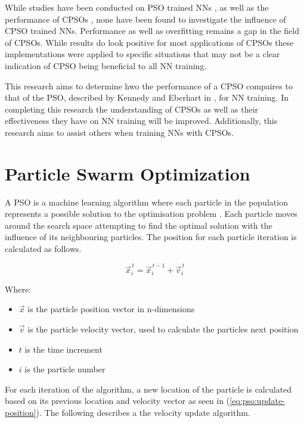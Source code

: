 \documentclass[conference]{IEEEtran}
\begin{document}
While studies have been conducted on \ac{PSO} trained \ac{NN}s \cite{vanwyk:overfitting-psoffnn, anna:saturation-psonn, anna:meas-sat-nn}, as well as the performance of \ac{CPSO}s \cite{pluhacek:cpso-cprng-imp, pluhacek:cpso-esb-chaotic}, none have been found to investigate the influence of \ac{CPSO} trained \ac{NN}s. Performance as well as overfitting remains a gap in the field of \ac{CPSO}s. While results do look positive for most applications of \ac{CPSO}s these implementations were applied to specific situations that may not be a clear indication of \ac{CPSO} being beneficial to all \ac{NN} training.

This research aims to determine hwo the performance of a \ac{CPSO} compaires to that of the \ac{PSO}, described by Kennedy and Eberhart in \cite{kennedy:pso}, for \ac{NN} training. In completing this research the understanding of \ac{CPSO}s as well as their effectiveness they have on \ac{NN} training will be improved. Additionally, this research aims to assist others when training \ac{NN}s with \ac{CPSO}s.

\section{Particle Swarm Optimization}
A \ac{PSO} is a machine learning algorithm where each particle in the population represents a possible solution to the optimisation problem \cite{anna:meas-sat-nn}. Each particle moves around the search space attempting to find the optimal solution with the influence of its neighbouring particles. The position for each particle iteration is calculated as follows.

\begin{equation} \label{eq:pso:update-position}
\vec{x}_{i}^{\,t} = \vec{x}_{i}^{\,t-1} + \vec{v}_{i}^{\,t}
\end{equation}

\noindent Where:
\begin{itemize}
	\item $ \vec{x} $ is the particle position vector in n-dimensions
	\item $ \vec{v} $ is the particle velocity vector, used to calculate the particles next position
	\item $t$ is the time increment
	\item $i$ is the particle number
\end{itemize}
\vspace{5mm}
\noindent For each iteration of the algorithm, a new location of the particle is calculated based on its previous location and velocity vector as seen in (\ref{eq:pso:update-position}). The following describes a the velocity update algorithm.
\end{document}
